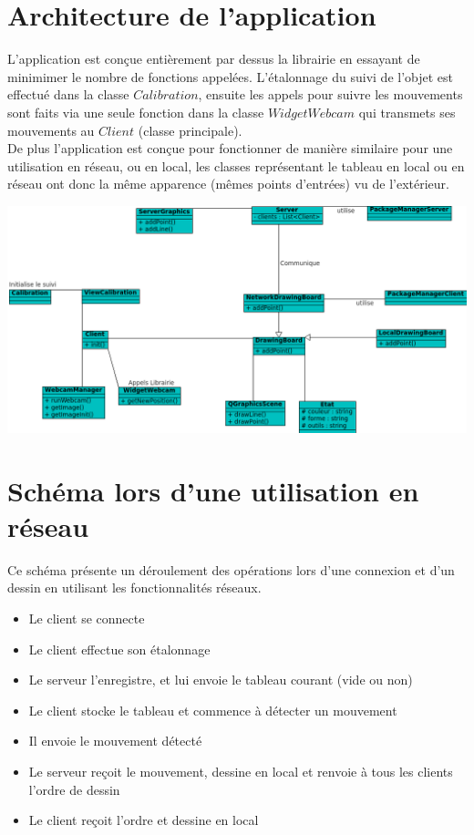 \documentclass{article}
\begin{document}
\newpage
\section{Architecture de l'application}
L'application est conçue entièrement par dessus la librairie en essayant de minimimer le nombre de fonctions appelées. 
L'étalonnage du suivi de l'objet est effectué dans la classe $Calibration$, ensuite les appels pour suivre les mouvements sont faits
via une seule fonction dans la classe $WidgetWebcam$ qui transmets ses mouvements au $Client$ (classe principale). \\

De plus l'application est conçue pour fonctionner de manière similaire pour une utilisation en réseau, ou en local, les classes 
représentant le tableau en local ou en réseau ont donc la même apparence (mêmes points d'entrées) vu de l'extérieur. \\
	\begin{center}
	\includegraphics[scale=0.7]{../uml/classes.png}
	\end{center}

\section{Schéma lors d'une utilisation en réseau}
Ce schéma présente un déroulement des opérations lors d'une connexion et d'un dessin en utilisant les fonctionnalités réseaux.\\

\begin{itemize}
	\item Le client se connecte
	\item Le client effectue son étalonnage
	\item Le serveur l'enregistre, et lui envoie le tableau courant (vide ou non)
	\item Le client stocke le tableau et commence à détecter un mouvement
	\item Il envoie le mouvement détecté
	\item Le serveur reçoit le mouvement, dessine en local et renvoie à tous les clients l'ordre de dessin
	\item Le client reçoit l'ordre et dessine en local
\end{itemize}
\end{document}
